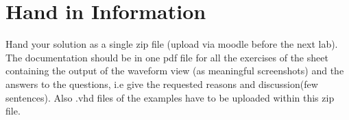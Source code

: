 \section{Hand in Information}

Hand your solution as a single zip file (upload via moodle before the next lab). The documentation should be in one pdf file for all the exercises of the sheet containing the output of the waveform view (as meaningful screenshots) and the answers to the questions, i.e give the requested reasons and discussion(few sentences). Also .vhd files of the examples have to be uploaded within this zip file.